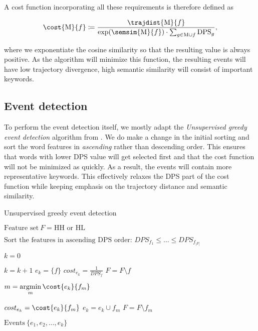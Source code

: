 A cost function incorporating all these requirements is therefore defined as

\begin{equation} \label{eq:cost-function}
	\cost{\featset}{f} \coloneqq \frac{\trajdist{\featset}{f}}{\exp(\semsim{\featset}{f}) \cdot \sum_{g \in \featset \cup f}{\text{DPS}_{g}}},
\end{equation}

where we exponentiate the cosine similarity so that the resulting value is always positive. As the algorithm will minimize this function, the resulting events will have low trajectory divergence, high semantic similarity will consist of important keywords.


\subsection{Event detection}
To perform the event detection itself, we mostly adapt the \textit{Unsupervised greedy event detection} algorithm from \cite{event-detection}. We do make a change in the initial sorting and sort the word features in \textit{ascending} rather than descending order. This ensures that words with lower DPS value will get selected first and that the cost function will not be minimized as quickly. As a result, the events will contain more representative keywords. This effectively relaxes the DPS part of the cost function while keeping emphasis on the trajectory distance and semantic similarity.

\begin{algorithm}[H] \label{alg:greedy-event-detection}
\begin{algorithmic}[1]
\caption{Unsupervised greedy event detection}
\Input $\text{Feature set} ~ F = \text{HH or HL}$

\State $\text{Sort the features in ascending DPS order: } DPS_{f_{1}} \leq \dots \leq DPS_{f_{\left\vert F \right\vert}}$

\State $k = 0$

	\State $k = k + 1$	
	\State $e_{k} = \{ f \}$
	\State $cost_{e_{k}} = \frac{1}{DPS_{f}}$
	\State $F = F \setminus f$
	
		\State $m = \argmin\limits_{m}{\cost{e_{k}}{f_{m}}}$

			\State $cost_{e_{k}} = \cost{e_{k}}{f_{m}}$
			\State $e_{k} = e_{k} \cup f_{m}$
			\State $F = F \setminus f_{m}$
		\Else
			\Break
		\EndIf
	\EndWhile
\EndFor

\Output $\text{Events} ~ \{ e_{1}, e_{2}, \dots, e_{k} \}$
\end{algorithmic}
\end{algorithm}


